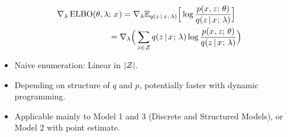 \begin{frame}
\begin{align*}
 \nabla_{\lambda} \operatorname*{ELBO}(\theta, \lambda &; \, x^{}) = \nabla_{\lambda} \mathbb{E}_{ q(z \,|\, x^{} ; \, \lambda)} \Big[ \log \frac{p(x^{}, z ; \, \theta)}{q(z \,|\, x^{} ; \, \lambda)} \Big]\\
 & =  \nabla_{\lambda} \Big( \sum_{z \in \mathcal{Z}}q(z \,|\, x^{} ; \, \lambda) \log \frac{p(x^{}, z ; \, \theta)}{q(z \,|\, x^{} ; \, \lambda)} \Big)
 \end{align*}

\begin{itemize}
    \item Naive enumeration: Linear in $|\mathcal{Z}|$.
    \item Depending on structure of $q$ and $p$, potentially faster with dynamic programming.
    \item Applicable mainly to Model 1 and 3 (Discrete and Structured Models), or Model 2 with 
    point estimate. 
\end{itemize}
\end{frame}




